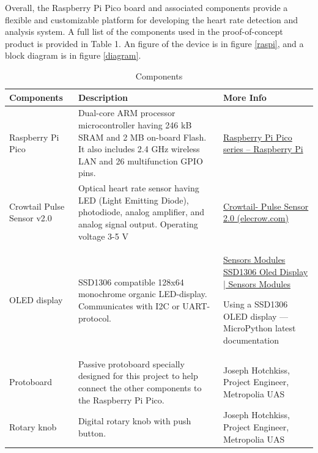 \documentclass{article}
\begin{document}
Overall, the Raspberry Pi Pico board and associated components provide a flexible and customizable platform for developing the heart rate detection and analysis system. A full list of the components used in the proof-of-concept product is provided in Table 1. An figure of the device is in figure \ref{raspi}, and a block diagram is in figure \ref{diagram}.


\begin{table}[h]
\centering
\begin{tabular}{|p{2cm}|p{5.5cm}|p{4cm}|}
\hline
\textbf{Components} & \textbf{Description} & \textbf{More Info} \\ \hline
Raspberry Pi Pico & Dual-core ARM processor microcontroller having 246 kB SRAM and 2 MB on-board Flash. It also includes 2.4 GHz wireless LAN and 26 multifunction GPIO pins.    & \href{https://www.raspberrypi.com/products/raspberry-pi-pico/}{Raspberry Pi Pico series – Raspberry Pi }    \\ \hline
Crowtail Pulse Sensor v2.0   & Optical heart rate sensor having LED (Light Emitting Diode), photodiode, analog amplifier, and analog signal output. Operating voltage 3-5 V  &  \href{https://www.elecrow.com/crowtail-pulse-sensor-p-1673.html}{Crowtail- Pulse Sensor 2.0 (elecrow.com)}   \\ \hline
OLED display   & SSD1306 compatible 128x64 monochrome organic LED-display. Communicates with I2C or UART-protocol.    & \href{https://docs.micropython.org/en/latest/esp8266/tutorial/ssd1306.html}{Sensors Modules SSD1306 Oled Display | Sensors Modules }

Using a SSD1306 OLED display — MicroPython latest documentation    \\ \hline
Protoboard   & Passive protoboard specially designed for this project to help connect the other components to the Raspberry Pi Pico.   & Joseph Hotchkiss, Project Engineer, Metropolia UAS   \\ \hline
Rotary knob  & Digital rotary knob with push button.    & Joseph Hotchkiss, Project Engineer, Metropolia UAS   \\ \hline
\end{tabular}
\caption{Components}
\label{table:version-history}
\end{table}
\end{document}
